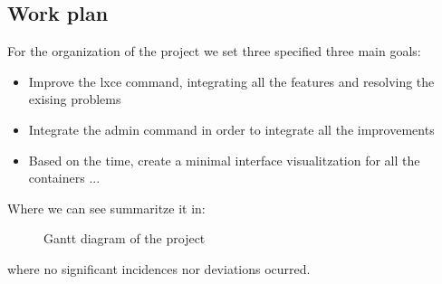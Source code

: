 \subsection{Work plan}
\label{ssec:gantt}
For the organization of the project we set three specified three main goals:
\begin{itemize}
	\item {Improve the lxce command, integrating all the features and resolving the exising problems}
	\item {Integrate the admin command in order to integrate all the improvements}
	\item {Based on the time, create a minimal interface visualitzation for all the containers ...}
\end{itemize}

Where we can see summaritze it in:
\begin{figure}[H]
    \centering
    
    \caption[Project's Gantt diagram]{\footnotesize{Gantt diagram of the project}}
    \label{fig:gantt}
\end{figure}
where no significant incidences nor deviations ocurred.
\bigskip

